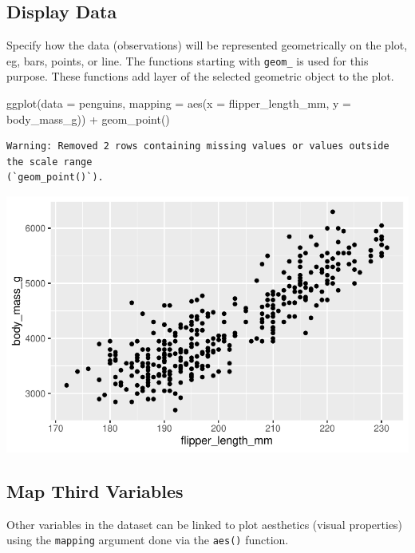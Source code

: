 \documentclass[
  letterpaper,
  DIV=11,
  numbers=noendperiod]{scrreprt}
\newenvironment{Shaded}{\begin{snugshade}}{\end{snugshade}}
\newcommand{\AttributeTok}[1]{\textcolor[rgb]{0.40,0.45,0.13}{#1}}
\newcommand{\FunctionTok}[1]{\textcolor[rgb]{0.28,0.35,0.67}{#1}}
\newcommand{\NormalTok}[1]{\textcolor[rgb]{0.00,0.23,0.31}{#1}}
\newcommand{\SpecialCharTok}[1]{\textcolor[rgb]{0.37,0.37,0.37}{#1}}
\begin{document}
\subsection{Display Data}\label{display-data}

Specify how the data (observations) will be represented geometrically on
the plot, eg, bars, points, or line. The functions starting with
\texttt{geom\_} is used for this purpose. These functions add layer of
the selected geometric object to the plot.

\begin{Shaded}
\begin{Highlighting}[]
\FunctionTok{ggplot}\NormalTok{(}\AttributeTok{data =}\NormalTok{ penguins,}
       \AttributeTok{mapping =} \FunctionTok{aes}\NormalTok{(}\AttributeTok{x =}\NormalTok{ flipper\_length\_mm, }\AttributeTok{y =}\NormalTok{ body\_mass\_g)) }\SpecialCharTok{+}
  \FunctionTok{geom\_point}\NormalTok{()}
\end{Highlighting}
\end{Shaded}

\begin{verbatim}
Warning: Removed 2 rows containing missing values or values outside the scale range
(`geom_point()`).
\end{verbatim}

\includegraphics{src/r-for-data-science/01-data-viz_files/figure-pdf/unnamed-chunk-10-1.pdf}

\subsection{Map Third Variables}\label{map-third-variables}

Other variables in the dataset can be linked to plot aesthetics (visual
properties) using the \texttt{mapping} argument done via the
\texttt{aes()} function.
\end{document}
